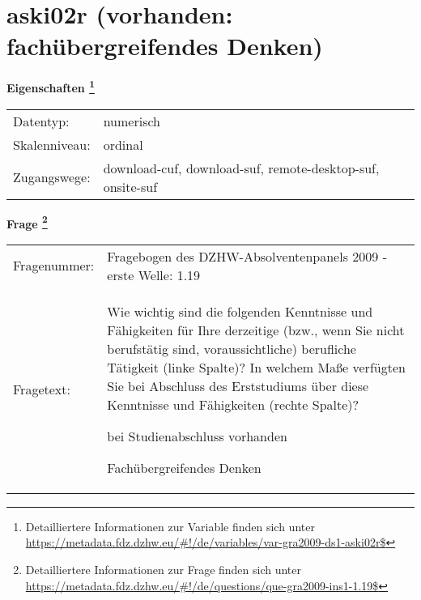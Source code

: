 
    \setcounter{footnote}{0}

    \vspace*{-1.8cm}
	\section{aski02r (vorhanden: fachübergreifendes Denken)}
	\label{section:aski02r}



    \vspace*{0.5cm}
    \noindent\textbf{Eigenschaften
	\footnote{Detailliertere Informationen zur Variable finden sich unter
		\url{https://metadata.fdz.dzhw.eu/\#!/de/variables/var-gra2009-ds1-aski02r$}}}\\
	\begin{tabularx}{\hsize}{@{}lX}
	Datentyp: & numerisch \\
	Skalenniveau: & ordinal \\
	Zugangswege: &
	  download-cuf, 
	  download-suf, 
	  remote-desktop-suf, 
	  onsite-suf
 \\
    \end{tabularx}



				\vspace*{0.5cm}
                \noindent\textbf{Frage
	                \footnote{Detailliertere Informationen zur Frage finden sich unter
		              \url{https://metadata.fdz.dzhw.eu/\#!/de/questions/que-gra2009-ins1-1.19$}}}\\
				\begin{tabularx}{\hsize}{@{}lX}
					Fragenummer: &
					  Fragebogen des DZHW-Absolventenpanels 2009 - erste Welle:
					  1.19
 \\
					Fragetext: & Wie wichtig sind die folgenden Kenntnisse und Fähigkeiten für Ihre derzeitige (bzw., wenn Sie nicht berufstätig sind, voraussichtliche) berufliche Tätigkeit (linke Spalte)? In welchem Maße verfügten Sie bei Abschluss des Erststudiums über diese Kenntnisse und Fähigkeiten (rechte Spalte)?\par  bei Studienabschluss vorhanden\par  Fachübergreifendes Denken \\
				\end{tabularx}





